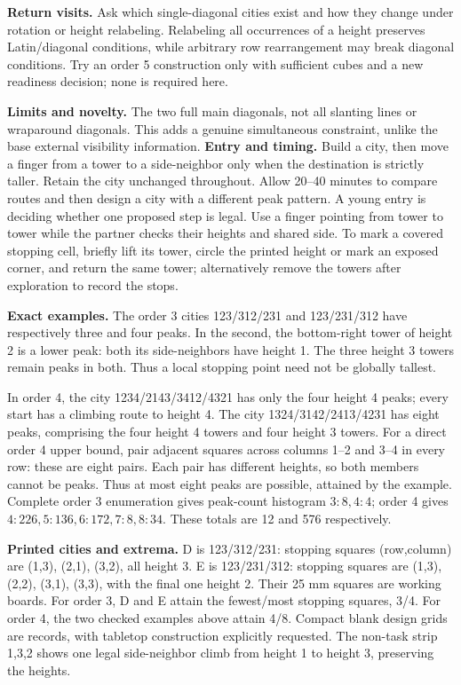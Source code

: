 \textbf{Return visits.} Ask which single-diagonal cities exist and how they change under rotation or height relabeling. Relabeling all occurrences of a height preserves Latin/diagonal conditions, while arbitrary row rearrangement may break diagonal conditions. Try an order 5 construction only with sufficient cubes and a new readiness decision; none is required here.

\textbf{Limits and novelty.} The two full main diagonals, not all slanting lines or wraparound diagonals. This adds a genuine simultaneous constraint, unlike the base external visibility information.
\newpage
{}
\textbf{Entry and timing.} Build a city, then move a finger from a tower to a side-neighbor only when the destination is strictly taller. Retain the city unchanged throughout. Allow 20--40 minutes to compare routes and then design a city with a different peak pattern. A young entry is deciding whether one proposed step is legal. Use a finger pointing from tower to tower while the partner checks their heights and shared side. To mark a covered stopping cell, briefly lift its tower, circle the printed height or mark an exposed corner, and return the same tower; alternatively remove the towers after exploration to record the stops.

\textbf{Exact examples.} The order 3 cities 123/312/231 and 123/231/312 have respectively three and four peaks. In the second, the bottom-right tower of height 2 is a lower peak: both its side-neighbors have height 1. The three height 3 towers remain peaks in both. Thus a local stopping point need not be globally tallest.

In order 4, the city 1234/2143/3412/4321 has only the four height 4 peaks; every start has a climbing route to height 4. The city 1324/3142/2413/4231 has eight peaks, comprising the four height 4 towers and four height 3 towers. For a direct order 4 upper bound, pair adjacent squares across columns 1--2 and 3--4 in every row: these are eight pairs. Each pair has different heights, so both members cannot be peaks. Thus at most eight peaks are possible, attained by the example. Complete order 3 enumeration gives peak-count histogram $3:8,4:4$; order 4 gives $4:226,5:136,6:172,7:8,8:34$. These totals are 12 and 576 respectively.

\textbf{Printed cities and extrema.} D is 123/312/231: stopping squares (row,column) are (1,3), (2,1), (3,2), all height 3. E is 123/231/312: stopping squares are (1,3), (2,2), (3,1), (3,3), with the final one height 2. Their 25 mm squares are working boards. For order 3, D and E attain the fewest/most stopping squares, 3/4. For order 4, the two checked examples above attain 4/8. Compact blank design grids are records, with tabletop construction explicitly requested. The non-task strip 1,3,2 shows one legal side-neighbor climb from height 1 to height 3, preserving the heights.


